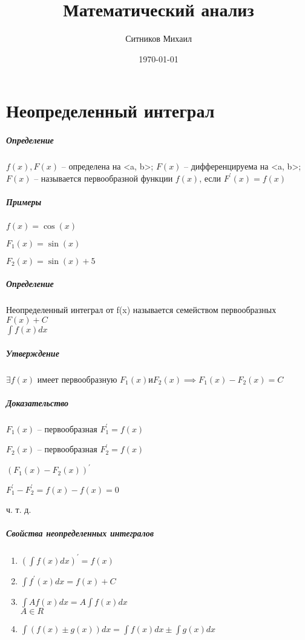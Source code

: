 \documentclass[a4paper]{article}
\title{Математический анализ}
\author{Ситников Михаил}
\date{\today}
\begin{document}
\maketitle
\tableofcontents
\newpage

\chapter{Неопределенный интеграл}
\paragraph{Определение}
$f(x), F(x)$ -- определена на <a, b>; $F(x)$ -- дифференцируема на <a, b>; $F(x)$ -- называется первообразной функции $f(x)$, если $F^{'}(x) = f(x)$ 
\paragraph{Примеры}
\par $f(x) = \cos(x)$ 
\par $ F_1(x) = \sin(x)$
\par $F_2(x) = \sin(x) + 5$ 
\paragraph{Определение}
Неопределенный интеграл от f(x) называется семейством первообразных ${F(x) + C}$ \\ $\int f(x)dx$ 
\paragraph{Утверждение}
$\exists  f(x)$ имеет первообразную $F_1(x) и F_2(x) \implies F_1(x) - F_2(x) = C$
\paragraph{Доказательство}
$F_1(x)$ -- первообразная  $F_1^{'}=f(x)$ 
\par $F_2(x)$ -- первообразная  $F_2^{'} = f(x)$ 
\par $(F_1(x) - F_2(x))^{'}$ 
\par $F_1^{'} - F_2^{'} = f(x) - f(x) = 0$ 
\par ч. т. д.

\paragraph{Свойства неопределенных интегралов}
\begin{enumerate}
  \item $(\int f(x)dx)^{'} = f(x)$ 
  \item $\int f^{'}(x)dx = f(x) + C$ 
  \item $\int Af(x)dx = A\int f(x)dx$ 
    \\ $A \in R$
  \item  $\int(f(x) \pm g(x))dx = \int f(x)dx \pm \int g(x)dx$
\end{enumerate}
\end{document}
